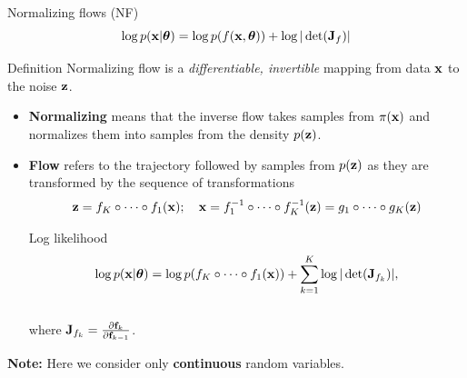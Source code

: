 \begin{frame}{Normalizing flows (NF)}
	\vspace{-0.3cm}
	\[
	\log p(\mathbf{x}|\boldsymbol{\theta}) = \log p(f(\mathbf{x}, \boldsymbol{\theta})) + \log |\det (\mathbf{J}_f)|
	\]
	\vspace{-0.4cm}
	\begin{block}{Definition}
		Normalizing flow is a \textit{differentiable, invertible} mapping from data $\mathbf{x}$ to the noise $\mathbf{z}$. 
	\end{block}
	\begin{itemize}
		\item \textbf{Normalizing} means that the inverse flow takes samples from $\pi(\mathbf{x})$ and normalizes them into samples from the density $p(\mathbf{z})$.
		\item \textbf{Flow} refers to the trajectory followed by samples from $p(\mathbf{z})$ as they are transformed by the sequence of transformations
		\[
		\mathbf{z} = f_K \circ \dots \circ f_1(\mathbf{x}); \quad \mathbf{x} = f_1^{-1} \circ \dots \circ f_K^{-1} (\mathbf{z}) = g_1 \circ \dots \circ g_K(\mathbf{z}) 
		\] 
		\vspace{-0.4cm}
		\begin{block}{Log likelihood}
			\vspace{-0.4cm}
			\[
			\log p(\mathbf{x} | \boldsymbol{\theta}) = \log p(f_K \circ \dots \circ f_1(\mathbf{x})) + \sum_{k=1}^K\log |\det (\mathbf{J}_{f_k})|,
			\]
			\vspace{-0.4cm} \\
			where $\mathbf{J}_{f_k} = \frac{\partial \mathbf{f}_k}{\partial \mathbf{f}_{k-1}}$.
		\end{block}
	\end{itemize}
	\textbf{Note:} Here we consider only \textbf{continuous} random variables.
\end{frame}

